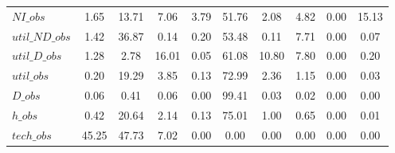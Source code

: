 \begin{center}
\begin{longtable}{lccccccccc}
$NI\_obs        $	 & 	         1.65	 & 	        13.71	 & 	         7.06	 & 	         3.79	 & 	        51.76	 & 	         2.08	 & 	         4.82	 & 	         0.00	 & 	        15.13 \\ 
$util\_ND\_obs  $	 & 	         1.42	 & 	        36.87	 & 	         0.14	 & 	         0.20	 & 	        53.48	 & 	         0.11	 & 	         7.71	 & 	         0.00	 & 	         0.07 \\ 
$util\_D\_obs   $	 & 	         1.28	 & 	         2.78	 & 	        16.01	 & 	         0.05	 & 	        61.08	 & 	        10.80	 & 	         7.80	 & 	         0.00	 & 	         0.20 \\ 
$util\_obs      $	 & 	         0.20	 & 	        19.29	 & 	         3.85	 & 	         0.13	 & 	        72.99	 & 	         2.36	 & 	         1.15	 & 	         0.00	 & 	         0.03 \\ 
$D\_obs         $	 & 	         0.06	 & 	         0.41	 & 	         0.06	 & 	         0.00	 & 	        99.41	 & 	         0.03	 & 	         0.02	 & 	         0.00	 & 	         0.00 \\ 
$h\_obs         $	 & 	         0.42	 & 	        20.64	 & 	         2.14	 & 	         0.13	 & 	        75.01	 & 	         1.00	 & 	         0.65	 & 	         0.00	 & 	         0.01 \\ 
$tech\_obs      $	 & 	        45.25	 & 	        47.73	 & 	         7.02	 & 	         0.00	 & 	         0.00	 & 	         0.00	 & 	         0.00	 & 	         0.00	 & 	         0.00 \\ 
\end{longtable}
 \end{center}
